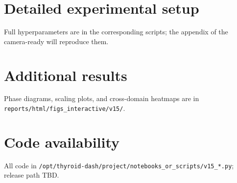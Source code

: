 \documentclass{article}
\begin{document}
\section{Detailed experimental setup}
Full hyperparameters are in the corresponding scripts; the appendix
of the camera-ready will reproduce them.

\section{Additional results}
Phase diagrams, scaling plots, and cross-domain heatmaps are in
\texttt{reports/html/figs\_interactive/v15/}.

\section{Code availability}
All code in
\texttt{/opt/thyroid-dash/project/notebooks\_or\_scripts/v15\_*.py};
release path TBD.
\end{document}
